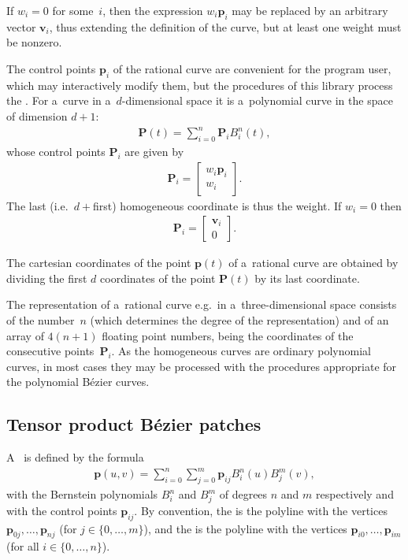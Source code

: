 If $w_i=0$ for some~$i$, then the expression $w_i\bm{p}_i$ may be replaced
by an arbitrary vector $\bm{v}_i$, thus extending the definition of the curve,
but at least one weight must be nonzero.

The control points $\bm{p}_i$ of the rational curve are convenient for the
program user, which may interactively modify them, but the procedures
of this library process the .
For a~curve in a~$d$-dimensional space it is a~polynomial curve in
the space of dimension $d+1$:
\begin{align}
  \bm{P}(t) = \sum_{i=0}^n\bm{P}_iB^n_i(t),
\end{align}
whose control points $\bm{P}_i$ are given by
\begin{align}
  \bm{P}_i = \left[\begin{array}{c}w_i\bm{p}_i \\ w_i \end{array}\right].
\end{align}
The last (i.e.\ $d+{}$first) homogeneous coordinate is thus the weight.
If $w_i=0$ then
\begin{align}
  \bm{P}_i = \left[\begin{array}{c}\bm{v}_i \\ 0 \end{array}\right].
\end{align}

The cartesian coordinates of the point $\bm{p}(t)$ of a~rational curve
are obtained by dividing the first $d$ coordinates of the point $\bm{P}(t)$
by its last coordinate.

The representation of a~rational curve e.g.\ in a~three-dimensional space
consists of the number~$n$ (which determines the degree of the representation)
and of an array of $4(n+1)$ floating point numbers, being the
coordinates of the consecutive points~$\bm{P}_i$.
As the homogeneous curves are ordinary polynomial curves, in most cases
they may be processed with the procedures appropriate for the polynomial
B\'{e}zier curves.


\subsection{Tensor product B\'{e}zier patches}

\begin{sloppypar}
A~ is defined by
the formula
\begin{align}
  \bm{p}(u,v) = \sum_{i=0}^n\sum_{j=0}^m \bm{p}_{ij}B^n_i(u)B^m_j(v),
\end{align}
with the Bernstein polynomials $B^n_i$ and $B^m_j$ of degrees
$n$ and $m$ respectively and with the control points $\bm{p}_{ij}$.
By convention, the  is the polyline
with the vertices
$\bm{p}_{0j},\ldots,\bm{p}_{nj}$ (for $j\in\{0,\ldots,m\}$),
and the  is the polyline with the vertices
$\bm{p}_{i0},\ldots,\bm{p}_{im}$ (for all $i\in\{0,\ldots,n\}$).
\end{sloppypar}

